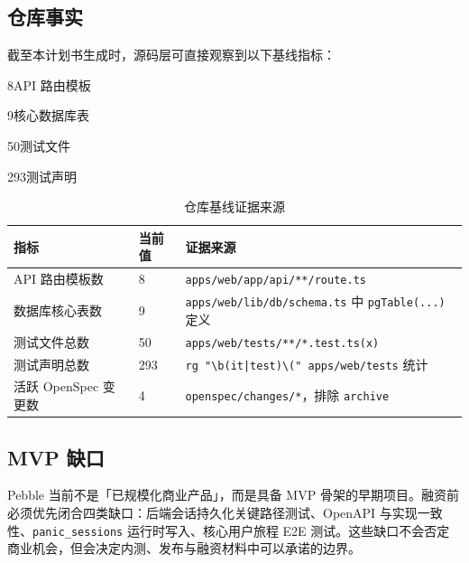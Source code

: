 \documentclass[UTF8,11pt,a4paper]{ctexart}
\newcommand{\thbg}[1]{\textcolor{PebbleInk}{\textbf{#1}}}
\begin{document}
\subsection{仓库事实}

截至本计划书生成时，源码层可直接观察到以下基线指标：

\vspace{2mm}
\begin{tcbraster}[raster columns=4, raster equal height, raster column skip=3mm]
  \begin{kpicard}{8}{API 路由模板}\end{kpicard}
  \begin{kpicard}{9}{核心数据库表}\end{kpicard}
  \begin{kpicard}{50}{测试文件}\end{kpicard}
  \begin{kpicard}{293}{测试声明}\end{kpicard}
\end{tcbraster}

\vspace{2mm}
\begin{table}[htbp]
\small
\caption{仓库基线证据来源}
\centering
\begin{tabularx}{\textwidth}{p{3.6cm}p{2cm}Y}
\toprule
{}\thbg{指标} & \thbg{当前值} & \thbg{证据来源} \\
\midrule
API 路由模板数 & 8 & \texttt{apps/web/app/api/**/route.ts} \\
数据库核心表数 & 9 & \texttt{apps/web/lib/db/schema.ts} 中 \texttt{pgTable(...)} 定义 \\
测试文件总数 & 50 & \texttt{apps/web/tests/**/*.test.ts(x)} \\
测试声明总数 & 293 & \texttt{rg "\textbackslash b(it|test)\textbackslash (" apps/web/tests} 统计 \\
活跃 OpenSpec 变更数 & 4 & \texttt{openspec/changes/*}，排除 \texttt{archive} \\
\bottomrule
\end{tabularx}
\end{table}

\subsection{MVP 缺口}

Pebble 当前不是「已规模化商业产品」，而是具备 MVP 骨架的早期项目。融资前必须优先闭合四类缺口：后端会话持久化关键路径测试、OpenAPI 与实现一致性、\texttt{panic\_sessions} 运行时写入、核心用户旅程 E2E 测试。这些缺口不会否定商业机会，但会决定内测、发布与融资材料中可以承诺的边界。
\end{document}
